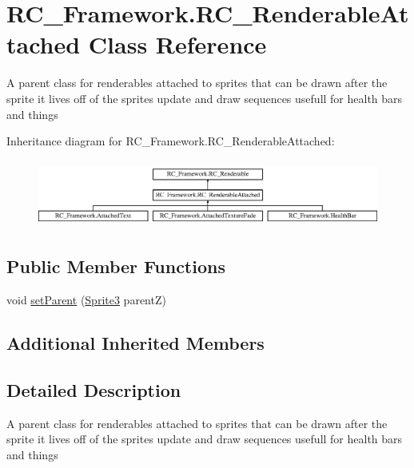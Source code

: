\hypertarget{class_r_c___framework_1_1_r_c___renderable_attached}{}\section{R\+C\+\_\+\+Framework.\+R\+C\+\_\+\+Renderable\+Attached Class Reference}
\label{class_r_c___framework_1_1_r_c___renderable_attached}


A parent class for renderables attached to sprites that can be drawn after the sprite it lives off of the sprites update and draw sequences usefull for health bars and things  


Inheritance diagram for R\+C\+\_\+\+Framework.\+R\+C\+\_\+\+Renderable\+Attached\+:\begin{figure}[H]
\begin{center}
\leavevmode
\includegraphics[height=2.240000cm]{class_r_c___framework_1_1_r_c___renderable_attached}
\end{center}
\end{figure}
\subsection*{Public Member Functions}
\begin{DoxyCompactItemize}
\item 
void \mbox{\hyperlink{class_r_c___framework_1_1_r_c___renderable_attached_aa8a7fd45e198635a8ee01c16877cfe8f}{set\+Parent}} (\mbox{\hyperlink{class_r_c___framework_1_1_sprite3}{Sprite3}} parentZ)
\end{DoxyCompactItemize}
\subsection*{Additional Inherited Members}


\subsection{Detailed Description}
A parent class for renderables attached to sprites that can be drawn after the sprite it lives off of the sprites update and draw sequences usefull for health bars and things 



